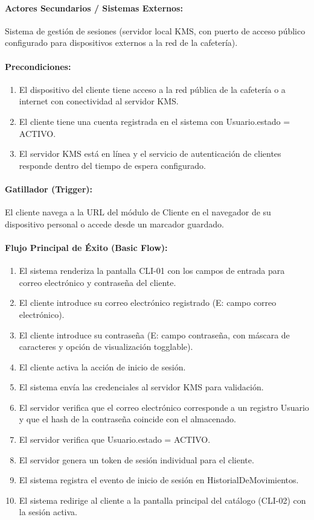 \paragraph{Actores Secundarios / Sistemas Externos:} Sistema de gestión de sesiones (servidor local KMS, con puerto de acceso público configurado para dispositivos externos a la red de la cafetería).

\paragraph{Precondiciones:}
\begin{enumerate}
    \item[I.] El dispositivo del cliente tiene acceso a la red pública de la cafetería o a internet con conectividad al servidor KMS.
    \item[II.] El cliente tiene una cuenta registrada en el sistema con Usuario.estado = ACTIVO.
    \item[III.] El servidor KMS está en línea y el servicio de autenticación de clientes responde dentro del tiempo de espera configurado.
\end{enumerate}

\paragraph{Gatillador (Trigger):} El cliente navega a la URL del módulo de Cliente en el navegador de su dispositivo personal o accede desde un marcador guardado.

\paragraph{Flujo Principal de Éxito (Basic Flow):}
\begin{enumerate}
    \item[I.] El sistema renderiza la pantalla CLI-01 con los campos de entrada para correo electrónico y contraseña del cliente.
    \item[II.] El cliente introduce su correo electrónico registrado (E: campo correo electrónico).
    \item[III.] El cliente introduce su contraseña (E: campo contraseña, con máscara de caracteres y opción de visualización togglable).
    \item[IV.] El cliente activa la acción de inicio de sesión.
    \item[V.] El sistema envía las credenciales al servidor KMS para validación.
    \item[VI.] El servidor verifica que el correo electrónico corresponde a un registro Usuario y que el hash de la contraseña coincide con el almacenado.
    \item[VII.] El servidor verifica que Usuario.estado = ACTIVO.
    \item[VIII.] El servidor genera un token de sesión individual para el cliente.
    \item[IX.] El sistema registra el evento de inicio de sesión en HistorialDeMovimientos.
    \item[X.] El sistema redirige al cliente a la pantalla principal del catálogo (CLI-02) con la sesión activa.
\end{enumerate}

